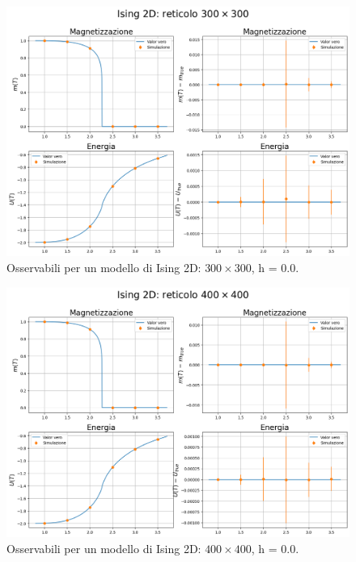\vspace*{\fill}

\newpage

\vspace*{\fill}

\begin{figure}[H]
    \centering
    \includegraphics[page=1, width=\textwidth]{Immagini/simIsing2D/obs/obs_300.png}
    \caption{Osservabili per un modello di Ising 2D: $300 \times 300$, h = 0.0.}
\end{figure}

\vspace*{\fill}

\newpage

\vspace*{\fill}

\begin{figure}[H]
    \centering
    \includegraphics[page=1, width=\textwidth]{Immagini/simIsing2D/obs/obs_400.png}
    \caption{Osservabili per un modello di Ising 2D: $400 \times 400$, h = 0.0.}
\end{figure}

